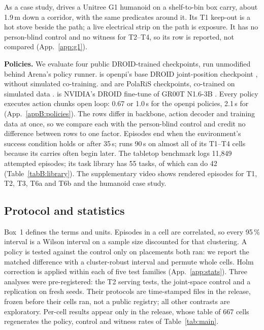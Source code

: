 As a case study, \gone{} \citep{ref5,ref13} drives a Unitree G1 humanoid on a shelf-to-bin box carry, about 1.9\,m down a corridor, with the same predicates around it.
Its T1 keep-out is a hot stove beside the path; a live electrical strip on the path is exposure.
It has no person-blind control and no witness for T2--T4, so its row is reported, not compared (App.~\ref{app:g1}).

\textbf{Policies.}
We evaluate four public DROID-trained checkpoints, run unmodified behind Arena's policy runner.
\pifive{} \citep{ref63} is openpi's base DROID joint-position checkpoint \citep{ref67}, without simulated co-training.
\pizero{} \citep{ref62} and \pifast{} \citep{ref64} are PolaRiS checkpoints, co-trained on simulated data \citep{ref66}.
\grfull{} is NVIDIA's DROID fine-tune of GR00T N1.6-3B \citep{ref13}.
Every policy executes action chunks open loop: 0.67 or 1.0\,s for the openpi policies, 2.1\,s for \grd{} (App.~\ref{appB:policies}).
The rows differ in backbone, action decoder and training data at once, so we compare each with the person-blind control and credit no difference between rows to one factor.
Episodes end when the environment's success condition holds or after 35\,s; \grd{} runs 90\,s on almost all of its T1--T4 cells because its carries often begin later.
The tabletop benchmark logs 11,849 attempted episodes; its task library has 55 tasks, of which \pifive{} can do 42 (Table~\ref{tabB:library}).
The supplementary video shows rendered episodes for T1, T2, T3, T6a and T6b and the humanoid case study.

\subsection{Protocol and statistics}
\label{sec:protocol}
\label{sec:stats}

Box~1 defines the terms and units.
Episodes in a cell are correlated, so every 95\,\% interval is a Wilson interval on a sample size discounted for that clustering.
A policy is tested against the control only on placements both ran: we report the matched difference with a cluster-robust interval and permute whole cells.
Holm correction is applied within each of five test families (App.~\ref{app:stats}).
Three analyses were pre-registered: the T2 serving tests, the joint-space control and a replication on fresh seeds.
Their protocols are time-stamped files in the release, frozen before their cells ran, not a public registry; all other contrasts are exploratory.
Per-cell results appear only in the release, whose table of 667 cells regenerates the policy, control and witness rates of Table~\ref{tab:main}.

